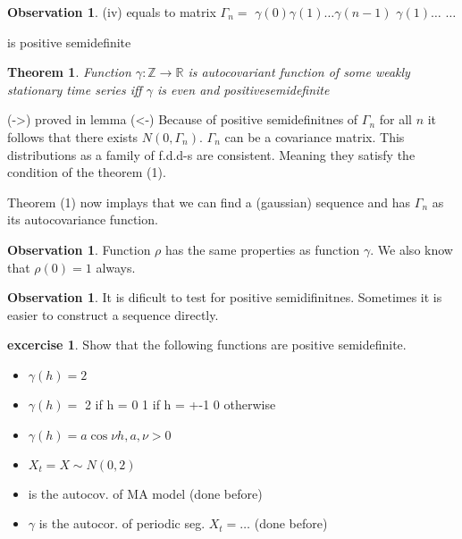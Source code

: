\documentclass[12pt,a4paper]{amsart}
\theoremstyle{definition} %
\newtheorem{excercise}[defn]{excercise}
\newtheorem{observation}[defn]{Observation}
\theoremstyle{plain} %
\newtheorem{theorem}[defn]{Theorem}
\newcommand{\R}{\mathbb R}
\newcommand{\Z}{\mathbb Z}
\begin{document}
\begin{observation}
(iv) equals to 
matrix $\Gamma_n = $
$\gamma(0) \gamma(1) \dots \gamma(n-1)$
$\gamma(1)\dots$
$\dots$

is positive semidefinite
\end{observation}


\begin{theorem}
Function $\gamma: \Z \rightarrow \R$ is autocovariant function of some weakly stationary time series 
iff
$\gamma$ is even and positivesemidefinite
\end{theorem}


\proof
(->) proved in lemma
(<-) Because of positive semidefinitnes of $\Gamma_n$ for all $n$ it follows that there exists $N(0, \Gamma_n)$. $\Gamma_n$ can be a covariance matrix. This distributions as a family of f.d.d-s are consistent. Meaning they satisfy the condition of the theorem 
 (1).

Theorem (1) now implays that we can find a (gaussian) sequence and has $\Gamma_n$ as its autocovariance function.

\endproof

\begin{observation}
Function $\rho$ has the same properties as function $\gamma$. We also know that $\rho(0) = 1$ always.
\end{observation}

\begin{observation}
It is dificult to test for positive semidifinitnes. Sometimes it is easier to construct a sequence directly.
\end{observation}

\begin{excercise}
Show that the following functions are positive semidefinite.
\begin{itemize}
\item $\gamma(h) = 2$
\item $\gamma(h) =$ 2 if h = 0 1 if h = +-1 0 otherwise
\item $\gamma(h) = a \cos{\nu h}, a, \nu > 0$
\end{itemize}
\begin{itemize}
\item $X_t = X \sim N(0,2)$
\item is the autocov. of MA model (done before)
\item $\gamma$ is the autocor. of periodic seg. $X_t = \dots$ (done before)
\end{itemize}


\end{excercise}
\end{document}
